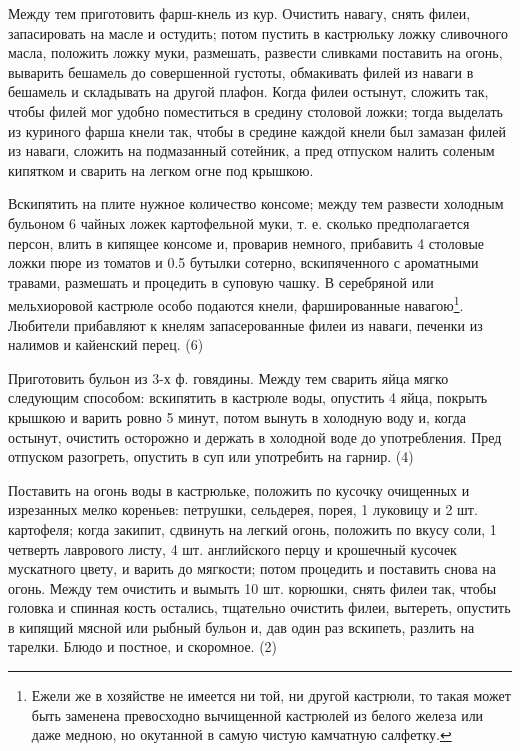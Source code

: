 Между тем приготовить фарш-кнель из кур. Очистить навагу, снять филеи, запасировать на масле и остудить; потом пустить в кастрюльку ложку сливочного масла, положить ложку муки, размешать, развести сливками поставить на огонь, выварить бешамель до совершенной густоты, обмакивать филей из наваги в бешамель и складывать на другой плафон. Когда филеи остынут, сложить так, чтобы филей мог удобно поместиться в средину столовой ложки; тогда выделать из куриного фарша кнели так, чтобы в средине каждой кнели был замазан филей из наваги, сложить на подмазанный сотейник, а пред отпуском налить соленым кипятком и сварить на легком огне под крышкою.

Вскипятить на плите нужное количество консоме; между тем развести холодным бульоном 6 чайных ложек картофельной муки, т. е. сколько предполагается персон, влить в кипящее консоме и, проварив немного, прибавить 4 столовые ложки пюре из томатов и 0.5 бутылки сотерно, вскипяченного с ароматными травами, размешать и процедить в суповую чашку. В серебряной или мельхиоровой кастрюле особо подаются кнели, фаршированные навагою\footnote{Ежели же в хозяйстве не имеется ни той, ни другой кастрюли, то такая может быть заменена превосходно вычищенной кастрюлей из белого железа или даже медною, но окутанной в самую чистую камчатную салфетку.}. Любители прибавляют к кнелям запасерованные филеи из наваги, печенки из налимов и кайенский перец. (6)


Приготовить бульон из 3-х ф. говядины. Между тем сварить яйца мягко следующим способом: вскипятить в кастрюле воды, опустить 4 яйца, покрыть крышкою и варить ровно 5 минут, потом вынуть в холодную воду и, когда остынут, очистить осторожно и держать в холодной воде до употребления. Пред отпуском разогреть, опустить в суп или употребить на гарнир. (4)


Поставить на огонь воды в кастрюльке, положить по кусочку очищенных и изрезанных мелко кореньев: петрушки, сельдерея, порея, 1 луковицу и 2 шт. картофеля; когда закипит, сдвинуть на легкий огонь, положить по вкусу соли, 1 четверть лаврового листу, 4 шт. английского перцу и крошечный кусочек мускатного цвету, и варить до мягкости; потом процедить и поставить снова на огонь. Между тем очистить и вымыть 10 шт. корюшки, снять филеи так, чтобы головка и спинная кость остались, тщательно очистить филеи, вытереть, опустить в кипящий мясной или рыбный бульон и, дав один раз вскипеть, разлить на тарелки. Блюдо и постное, и скоромное. (2)


